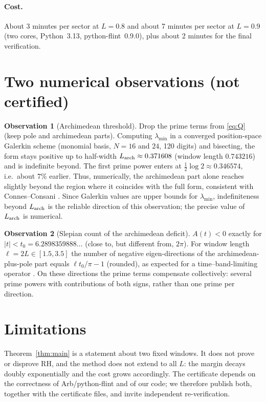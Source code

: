 \documentclass[11pt,a4paper]{article}
\theoremstyle{remark}
\theoremstyle{definition}
\newtheorem{observation}{Observation}
\begin{document}
\paragraph{Cost.} About 3 minutes per sector at $L=0.8$ and about 7 minutes per sector at $L=0.9$ (two cores, Python~3.13, python-flint~0.9.0), plus about 2 minutes for the final verification.

\section{Two numerical observations (not certified)}

\begin{observation}[Archimedean threshold]
Drop the prime terms from \eqref{eq:Q} (keep pole and archimedean parts). Computing $\lambda_{\min}$ in a converged position-space Galerkin scheme (monomial basis, $N=16$ and $24$, 120 digits) and bisecting, the form stays positive up to half-width $L_{\rm arch}\approx0.371608$ (window length $0.743216$) and is indefinite beyond. The first prime power enters at $\frac12\log2\approx0.346574$, i.e.\ about $7\%$ earlier. Thus, numerically, the archimedean part alone reaches slightly beyond the region where it coincides with the full form, consistent with Connes--Consani \cite{CC21}. Since Galerkin values are upper bounds for $\lambda_{\min}$, indefiniteness beyond $L_{\rm arch}$ is the reliable direction of this observation; the precise value of $L_{\rm arch}$ is numerical.
\end{observation}

\begin{observation}[Slepian count of the archimedean deficit]
$A(t)<0$ exactly for $|t|<t_0=6.2898359888\ldots$ (close to, but different from, $2\pi$). For window length $\ell=2L\in[1.5,3.5]$ the number of negative eigen-directions of the archimedean-plus-pole part equals $\ell t_0/\pi-1$ (rounded), as expected for a time--band-limiting operator \cite{SlepianPollak61,LandauWidom80}. On these directions the prime terms compensate collectively: several prime powers with contributions of both signs, rather than one prime per direction.
\end{observation}

\section{Limitations}
Theorem~\ref{thm:main} is a statement about two fixed windows. It does not prove or disprove RH, and the method does not extend to all $L$: the margin decays doubly exponentially and the cost grows accordingly. The certificate depends on the correctness of Arb/python-flint and of our code; we therefore publish both, together with the certificate files, and invite independent re-verification.
\end{document}
